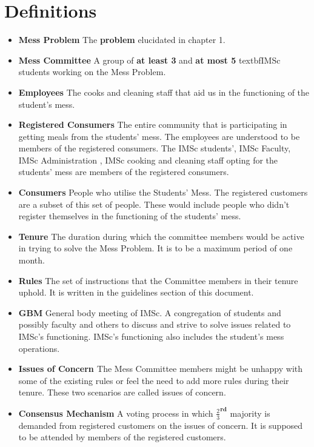 \documentclass[12pt]{report}
\begin{document}
\section{Definitions}
\begin{itemize}
\item{\textbf{Mess Problem}} The \textbf{problem} elucidated in chapter 1.
\item{\textbf{Mess Committee}} A group of \textbf{at least 3} and \textbf{at most 5} textbf{IMSc students} working on the Mess Problem. 
 \item{\textbf{Employees} \label{emp}} The cooks and cleaning staff that aid us in the functioning of the student's mess.
\item{\textbf{Registered Consumers}\label{rc}} The entire community that is participating in getting meals from the students' mess. The employees are understood to be members of the registered consumers. The IMSc students', IMSc Faculty, IMSc Administration , IMSc cooking and cleaning staff opting for the students' mess are members of the registered consumers.
\item{\textbf{Consumers}} People who utilise the Students' Mess. The registered customers are a subset of this set of people. These would include people who didn't register themselves in the functioning of the students' mess.
 \item{\textbf{Tenure}} The duration during which the committee members would be active in trying to solve the Mess Problem. It is to be a maximum period of one month.
\item{\textbf{Rules}} The set of instructions that the Committee members in their tenure uphold. It is written in the guidelines section of this document.
\item{\textbf{GBM}} General body meeting of IMSc. A congregation of students and possibly faculty and others to discuss and strive to solve issues related to IMSc's functioning. IMSc's functioning also includes the student's mess operations.
\item{\textbf{Issues of Concern \label{ioc}}} The Mess Committee members might be unhappy with some of the existing rules or feel the need to add more rules during their tenure. These two scenarios are called issues of concern.
\item{\textbf{Consensus Mechanism}\label{cons}} A voting process in which  $\frac{2}{3}^{\textbf{rd}}$ majority is demanded from registered customers on the issues of concern. It is supposed to be attended by members of the registered customers.

\end{itemize}
\end{document}
